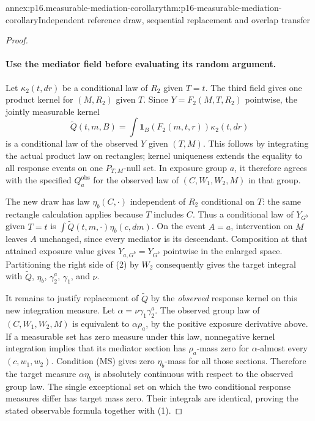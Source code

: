 \begin{annexitem}{annex:p16.measurable-mediation-corollary}{thm:p16-measurable-mediation-corollary}{Independent reference draw, sequential replacement and overlap transfer}
\begin{proof}
\paragraph{Use the mediator field before evaluating its random argument.}
Let \(\kappa_2(t,dr)\) be a conditional law of \(R_2\) given
\(T=t\). The third field gives one product kernel for
\((M,R_2)\) given \(T\). Since
\(Y=F_2(M,T,R_2)\) pointwise, the jointly measurable kernel
\[
 \widetilde Q(t,m,B)=\int\mathbf1_B(F_2(m,t,r))\kappa_2(t,dr)
\]
is a conditional law of the observed \(Y\) given \((T,M)\).
This follows by integrating the actual product law on rectangles;
kernel uniqueness extends the equality to all response events on
one \(P_{T,M}\)-null set. In exposure group \(a\), it therefore
agrees with the specified \(Q_a^{\mathrm{obs}}\) for the observed
law of \((C,W_1,W_2,M)\) in that group.

The new draw has law \(\eta_b(C,\cdot)\) independent of \(R_2\)
conditional on \(T\): the same rectangle calculation applies because
\(T\) includes \(C\). Thus a conditional law of \(Y_{G^b}\) given
\(T=t\) is \(\int\widetilde Q(t,m,\cdot)\eta_b(c,dm)\).
On the event \(A=a\), intervention on \(M\) leaves \(A\) unchanged,
since every mediator is its descendant. Composition at that attained
exposure value gives \(Y_{a,G^b}=Y_{G^b}\) pointwise in the enlarged
space. Partitioning the right side of (2) by \(W_2\) consequently
gives the target integral with \(\widetilde Q\), \(\eta_b\),
\(\gamma_2^a\), \(\gamma_1\), and \(\nu\).

It remains to justify replacement of \(\widetilde Q\) by the
\emph{observed} response kernel on this new integration measure.
Let \(\alpha=\nu\gamma_1\gamma_2^a\). The observed group law
of \((C,W_1,W_2,M)\) is equivalent to \(\alpha\rho_a\),
by the positive exposure derivative above. If a measurable set has
zero measure under this law, nonnegative kernel integration implies
that its mediator section has \(\rho_a\)-mass zero for
\(\alpha\)-almost every \((c,w_1,w_2)\). Condition (MS) gives
zero \(\eta_b\)-mass for all those sections. Therefore the
target measure \(\alpha\eta_b\) is absolutely continuous with
respect to the observed group law. The single exceptional set on
which the two conditional response measures differ has target mass
zero. Their integrals are identical, proving the stated observable
formula together with (1).


\end{proof}
\end{annexitem}
